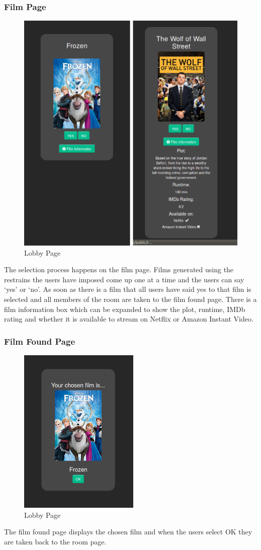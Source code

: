 \documentclass{article}
\begin{document}
\subsubsection{Film Page}
\begin{figure}[H]
\centering
\caption{Lobby Page}
\label{sec:sysarchitecture}
\includegraphics[scale=0.5]{filmpage}
\end{figure}
The selection process happens on the film page. Films generated using the restrains the users have imposed come up one at a time and the users can say ‘yes’ or ‘no’. As soon as there is a film that all users have said yes to that film is selected and all members of the room are taken to the film found page. There is a film information box which can be expanded to show the plot, runtime, IMDb rating and whether it is available to stream on Netflix or Amazon Instant Video. 
\subsubsection{Film Found Page}
\begin{figure}[H]
\centering
\caption{Lobby Page}
\label{sec:sysarchitecture}
\includegraphics[scale=0.5]{filmfoundpage}
\end{figure}
The film found page displays the chosen film and when the users select OK they are taken back to the room page.
\end{document}
